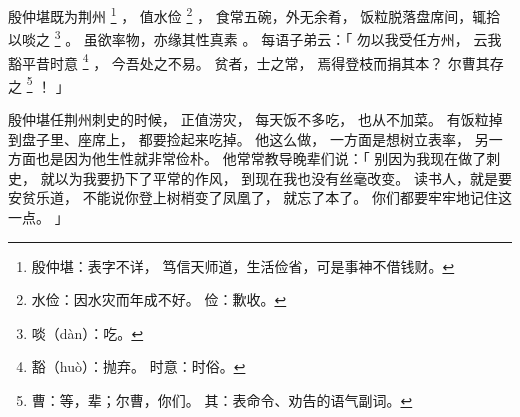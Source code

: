 
\switchcolumn*[\section{}]

殷仲堪既为荆州%
\footnote{%
    殷仲堪：表字不详，
            笃信天师道，生活俭省，可是事神不借钱财。
}%
，
值水俭%
\footnote{%
    水俭：因水灾而年成不好。
    俭：歉收。
}%
，
食常五碗，外无余肴，
饭粒脱落盘席间，辄拾以啖之%
\footnote{%
    啖（dàn）：吃。
}%
。
虽欲率物，亦缘其性真素
。
每语子弟云：「
    勿以我受任方州，
    云我豁平昔时意%
    \footnote{%
        豁（huò）：抛弃。
        时意：时俗。
    }%
    ，
    今吾处之不易。
    贫者，士之常，
    焉得登枝而捐其本？
    尔曹其存之%
    \footnote{%
        曹：等，辈；尔曹，你们。
        其：表命令、劝告的语气副词。
    }%
    ！
」

\switchcolumn

殷仲堪任荆州刺史的时候，
正值涝灾，
每天饭不多吃，
也从不加菜。
有饭粒掉到盘子里、座席上，
都要捡起来吃掉。
他这么做，
一方面是想树立表率，
另一方面也是因为他生性就非常俭朴。
他常常教导晚辈们说：「
    别因为我现在做了刺史，
    就以为我要扔下了平常的作风，
    到现在我也没有丝毫改变。
    读书人，就是要安贫乐道，
    不能说你登上树梢变了凤凰了，
    就忘了本了。
    你们都要牢牢地记住这一点。
」
